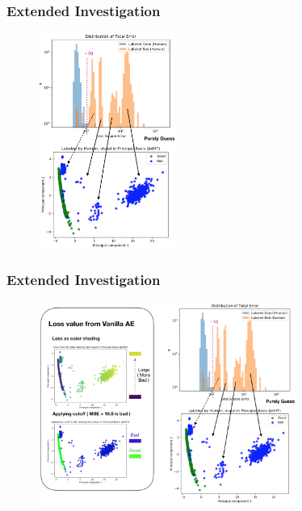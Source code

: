 \documentclass{beamer}
\begin{document}
\begin{frame}
\frametitle{Extended Investigation}
\begin{figure}
    \includegraphics[height=0.85\textheight, width=0.4\textwidth]{images/guess}
\end{figure}
\end{frame}

\begin{frame}
\frametitle{Extended Investigation}
\begin{figure}
    \includegraphics[height=0.85\textheight, width=0.75\textwidth]{images/guess_visual}
\end{figure}
\end{frame}

\end{document}

